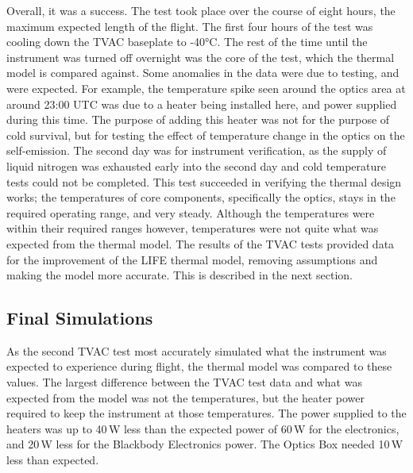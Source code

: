 Overall, it was a success. The test took place over the course of eight hours, the maximum expected length of the flight. The first four hours of the test was cooling down the TVAC baseplate to -40°C. The rest of the time until the instrument was turned off overnight was the core of the test, which the thermal model is compared against. Some anomalies in the data were due to testing, and were expected. For example, the temperature spike seen around the optics area at around 23:00 UTC was due to a heater being installed here, and power supplied during this time. The purpose of adding this heater was not for the purpose of cold survival, but for testing the effect of temperature change in the optics on the self-emission. The second day was for instrument verification, as the supply of liquid nitrogen was exhausted early into the second day and cold temperature tests could not be completed. This test succeeded in verifying the thermal design works; the temperatures of core components, specifically the optics, stays in the required operating range, and very steady. Although the temperatures were within their required ranges however, temperatures were not quite what was expected from the thermal model. The results of the TVAC tests provided data for the improvement of the LIFE thermal model, removing assumptions and making the model more accurate. This is described in the next section.

\subsection{Final Simulations}\label{final_pre_flight_sims}
As the second TVAC test most accurately simulated what the instrument was expected to experience during flight, the thermal model was compared to these values. The largest difference between the TVAC test data and what was expected from the model was not the temperatures, but the heater power required to keep the instrument at those temperatures. The power supplied to the heaters was up to 40\,W less than the expected power of 60\,W for the electronics, and 20\,W less for the Blackbody Electronics power. The Optics Box needed 10\,W less than expected.

